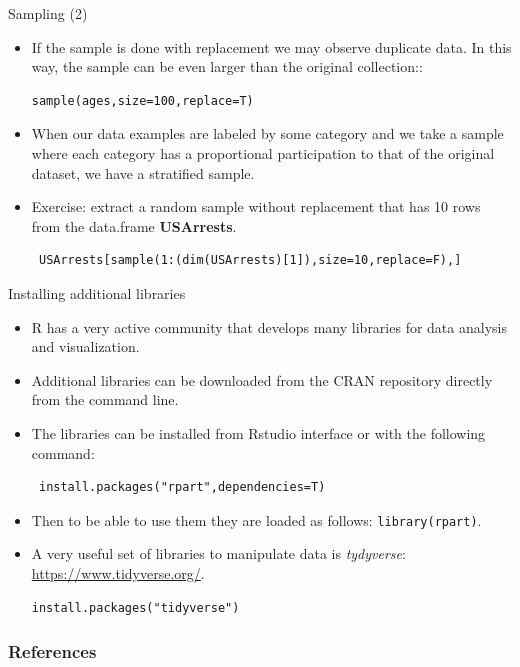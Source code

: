 \documentclass[handout]{beamer}
\begin{document}
\begin{frame}[fragile]{Sampling (2)}
\scriptsize{
\begin{itemize}
 \item If the sample is done with replacement we may observe duplicate data. In this way, the sample can be even larger than the original collection:: 

\begin{verbatim}
sample(ages,size=100,replace=T)
\end{verbatim}
 
 \item When our data examples are labeled by some category and we take a sample where each category has a proportional participation to that of the original dataset, we have a stratified sample.  
 
 \item Exercise: extract a random sample without replacement that has 10 rows from the data.frame \textbf{USArrests}. 
 
 \begin{verbatim}
 USArrests[sample(1:(dim(USArrests)[1]),size=10,replace=F),]
 \end{verbatim}

\end{itemize}



}
\end{frame}






\begin{frame}[fragile]{Installing additional libraries}
\scriptsize{
\begin{itemize}
 \item R has a very active community that develops many libraries for data analysis and visualization.
 \item Additional libraries can be downloaded from the CRAN repository directly from the command line.
 \item The libraries can be installed from Rstudio interface or with the following command:
 \begin{verbatim}
 install.packages("rpart",dependencies=T)
\end{verbatim} 

\item Then to be able to use them they are loaded as follows: \verb+library(rpart)+.

\item A very useful set of libraries to manipulate data is \textit{tydyverse}:  \url{https://www.tidyverse.org/}.

 \begin{verbatim}
install.packages("tidyverse")
\end{verbatim} 


 
 \end{itemize}

 
}
 
\end{frame}




\begin{frame}[allowframebreaks]\scriptsize
\frametitle{References}


%
\end{frame}  






\end{document}
